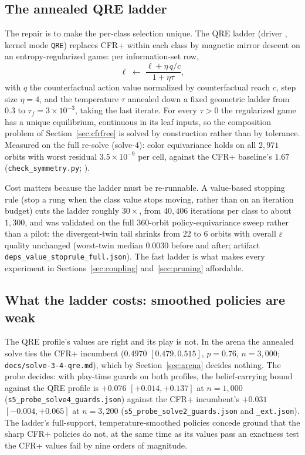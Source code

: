 \documentclass[11pt]{article}
\theoremstyle{plain}
\theoremstyle{definition}
\theoremstyle{remark}
\newcommand{\code}[1]{\texttt{\small #1}}
\begin{document}
\subsection{The annealed QRE ladder}\label{sec:qre}

The repair is to make the per-class selection unique. The QRE ladder
(driver , kernel mode \code{QRE}) replaces CFR+
within each class by magnetic mirror descent \cite{sokota2022} on an
entropy-regularized game: per information-set row,
\[
  \ell \;\leftarrow\; \frac{\ell + \eta\, q / c}{1 + \eta\tau},
\]
with $q$ the counterfactual action value normalized by counterfactual
reach $c$, step size $\eta=4$, and the temperature $\tau$ annealed down
a fixed geometric ladder from $0.3$ to $\tau_f = 3\times10^{-3}$,
taking the last iterate. For every
$\tau>0$ the regularized game has a unique equilibrium, continuous in
its leaf inputs, so the composition problem of
Section~\ref{sec:cfrfree} is solved by construction rather than by
tolerance. Measured on the full re-solve (solve-4): color equivariance
holds on all $2{,}971$ orbits with worst residual $3.5\times10^{-9}$
per cell, against the CFR+ baseline's $1.67$
(\code{check\_symmetry.py}; \cite{rb2}).

Cost matters because the ladder must be re-runnable. A value-based
stopping rule (stop a rung when the class value stops moving, rather
than on an iteration budget) cuts the ladder roughly $30\times$, from
$40{,}406$ iterations per class to about $1{,}300$, and was validated on
the full $360$-orbit policy-equivariance sweep rather than a pilot: the
divergent-twin tail shrinks from $22$ to $6$ orbits with overall
$\varepsilon$ quality unchanged (worst-twin median $0.0030$ before and
after; artifact \code{deps\_value\_stoprule\_full.json}). The fast
ladder is what makes every experiment in
Sections~\ref{sec:coupling} and~\ref{sec:pruning} affordable.

\subsection{What the ladder costs: smoothed policies are weak}
\label{sec:qrecost}

The QRE profile's values are right and its play is not. In the arena the
annealed solve ties the CFR+ incumbent ($0.4970$ $[0.479, 0.515]$,
$p=0.76$, $n=3{,}000$; \code{docs/solve-3-4-qre.md}), which by
Section~\ref{sec:arena} decides nothing. The probe decides: with
play-time guards on both profiles, the belief-carrying bound against
the QRE profile is $+0.076$ $[+0.014,+0.137]$ at $n=1{,}000$
(\code{s5\_probe\_solve4\_guards.json}) against the CFR+ incumbent's
$+0.031$ $[-0.004,+0.065]$ at $n=3{,}200$
(\code{s5\_probe\_solve2\_guards.json} and \code{\_ext.json}). The
ladder's full-support, temperature-smoothed policies concede ground
that the sharp CFR+ policies do not, at the same time as its values
pass an exactness test the CFR+ values fail by nine orders of
magnitude.
\end{document}
